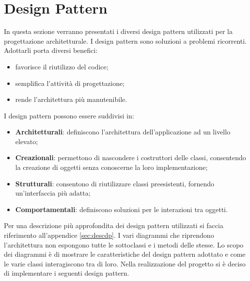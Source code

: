 %



\section{Design Pattern} %
\label{sec:design_pattern}
In questa sezione verranno presentati i diversi design pattern utilizzati per la progettazione architetturale. I design pattern sono soluzioni a problemi ricorrenti. Adottarli porta diversi benefici:
	\begin{itemize}
		\item favorisce il riutilizzo del codice;
		\item semplifica l’attività di progettazione;
		\item rende l’architettura più manutenibile.
	\end{itemize}
	\noindent
I design pattern possono essere suddivisi in:
	\begin{itemize}
		\item \textbf{Architetturali}: definiscono l’architettura dell’applicazione ad un livello elevato;
		\item \textbf{Creazionali}: permettono di nascondere i costruttori delle classi, consentendo la creazione di oggetti senza conoscerne la loro implementazione;
		\item \textbf{Strutturali}: consentono di riutilizzare classi preesistenti, fornendo un’interfaccia più adatta;
		\item \textbf{Comportamentali}: definiscono soluzioni per le interazioni tra oggetti.
	\end{itemize}
	\noindent
	\newline
Per una descrizione più approfondita dei design pattern utilizzati si faccia riferimento all’appendice \ref{sec:descdp}. I vari diagrammi che riprendono l’architettura non espongono tutte le sottoclassi e i metodi delle stesse. Lo scopo dei diagrammi è di mostrare le caratteristiche del design pattern adottato e come le varie classi interagiscono tra di loro. Nella realizzazione del progetto \projectName{} si è deciso di implementare i seguenti design pattern.

	\pagebreak

	 \clearpage \newpage
	 \clearpage \newpage
	 \clearpage \newpage
	 \clearpage \newpage
